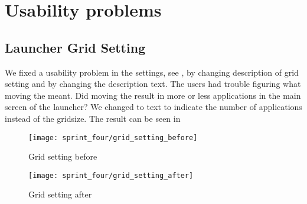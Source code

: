 
\section{Usability problems}
\label{sec:usability_problems}

\subsection{Launcher Grid Setting}
We fixed a usability problem in the \launcher settings, see , by changing description of grid setting and by changing the description text. The users had trouble figuring what moving the  meant. Did moving the  result in more or less applications in the main screen of the launcher? We changed to text to indicate the number of applications instead of the gridsize. The result can be seen in   

\begin{figure}[!htbp]
        \centering
        \texttt{[image: sprint\_four/grid\_setting\_before]}
        \caption{Grid setting before}
        \label{fig:launcher_grid_settings_old}
\end{figure}

\begin{figure}[!htbp]
        \centering
        \texttt{[image: sprint\_four/grid\_setting\_after]}
        \caption{Grid setting after}
        \label{fig:launcher_grid_settings_new}
\end{figure} 
